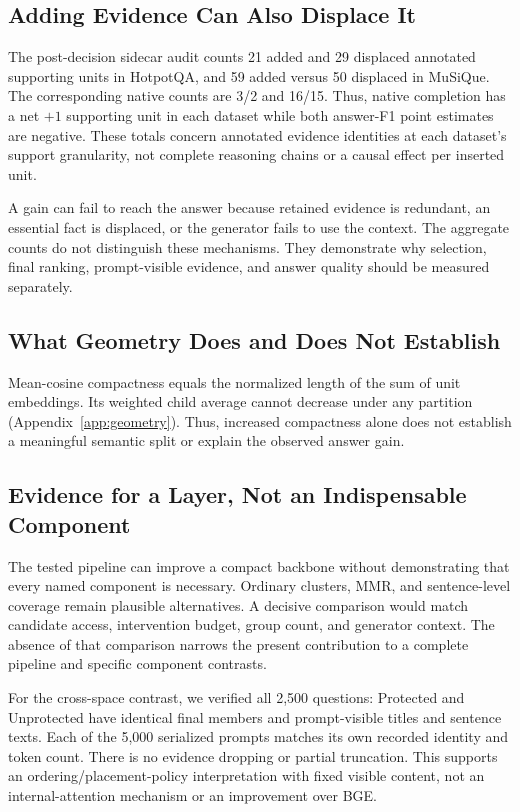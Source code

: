 \documentclass[11pt]{article}
\begin{document}
\subsection{Adding Evidence Can Also Displace It}
The post-decision sidecar audit counts 21 added and 29 displaced annotated
supporting units in HotpotQA, and 59 added versus 50 displaced in MuSiQue.
The corresponding native counts are 3/2 and 16/15.
Thus, native completion has a net $+1$ supporting unit in each dataset while
both answer-F1 point estimates are negative. These totals concern annotated
evidence identities at each dataset's support granularity, not complete
reasoning chains or a causal effect per inserted unit.

A gain can fail to reach the answer because retained evidence is redundant,
an essential fact is displaced, or the generator fails to use the context.
The aggregate counts do not distinguish these mechanisms. They demonstrate
why selection, final ranking, prompt-visible evidence, and answer quality
should be measured separately.

\subsection{What Geometry Does and Does Not Establish}
Mean-cosine compactness equals the normalized length of the sum of unit
embeddings. Its weighted child average cannot decrease under any partition
(Appendix~\ref{app:geometry}). Thus, increased compactness alone does not
establish a meaningful semantic split or explain the observed answer gain.

\subsection{Evidence for a Layer, Not an Indispensable Component}
The tested pipeline can improve a compact backbone without demonstrating that
every named component is necessary. Ordinary clusters, MMR, and sentence-level
coverage remain plausible alternatives. A decisive comparison would match
candidate access, intervention budget, group count, and generator context.
The absence of that comparison narrows the present contribution to a complete
pipeline and specific component contrasts.

For the cross-space contrast, we verified all 2,500 questions: Protected and
Unprotected have identical final members and prompt-visible titles and
sentence texts. Each of the 5,000 serialized prompts matches its own recorded
identity and token count. There is no evidence dropping or partial truncation.
This supports an ordering/placement-policy interpretation with fixed visible
content, not an internal-attention mechanism or an improvement over BGE.
\end{document}
